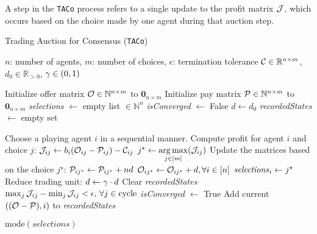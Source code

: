 \begin{definition}[Step, $k$]  
A step in the \texttt{TACo} process refers to a single update to the profit matrix $\mathcal{J}$, which occurs based on the choice made by one agent during that auction step.
\end{definition}

\begin{algorithm} [hbt!]
\caption{Trading Auction for Consensus (\texttt{TACo})}\label{alg:TACo}
\begin{algorithmic}[1]
\Require $n$: number of agents, $m$: number of choices, $\epsilon$: termination tolerance
\Require $\mathcal{C} \in \mathbb{R}^{n \times m}$, $d_0 \in \mathbb{R}_{>0}$, $\gamma \in (0,1)$

\State Initialize offer matrix $\mathcal{O} \in \mathbb{N}^{n \times m}$ to $\mathbf{0}_{n \times m}$
\State Initialize pay matrix $\mathcal{P} \in \mathbb{N}^{n \times m}$ to $\mathbf{0}_{n \times m}$
\State \textit{selections} $\gets$ empty list $\in \mathbb{N}^n$
\State \textit{isConverged} $\gets$ False
\State $d \gets d_0$ 
\State \textit{recordedStates} $\gets$ empty set 

    \State Choose a playing agent $i$ in a sequential manner.
        \State Compute profit for agent $i$ and choice $j$:
        \State $\mathcal{J}_{ij} \gets b_i (\mathcal{O}_{ij} - \mathcal{P}_{ij}) - \mathcal{C}_{ij}$
    \EndFor
    \State $j^\star \gets \underset{j \in [m]}{\arg\max}(\mathcal{J}_{ij})$ 
    \State Update the matrices based on the choice $j^\star$:
    \State \quad $\mathcal{P}_{ij^\star} \gets \mathcal{P}_{ij^\star} + nd$
    \State \quad $\mathcal{O}_{ij^\star} \gets \mathcal{O}_{ij^\star} + d, \forall i\in [n]$
    \State $\text{\textit{selections}}_i \gets j^\star$ 
     
        \State Reduce trading unit: $d \gets \gamma \cdot d$
        \State Clear \textit{recordedStates}
            \State $\max_j \mathcal{J}_{ij} - \min_j \mathcal{J}_{ij} < \epsilon, \, \forall j \in \text{cycle}$ 
        \EndFor
            \State \textit{isConverged} $\gets$ True
        \EndIf
    \EndIf
    \State Add current $((\mathcal{O}-\mathcal{P}), i)$ to \textit{recordedStates}
\EndWhile

\State \Return $\text{mode}(\textit{selections})$ 

\end{algorithmic}
\end{algorithm}

